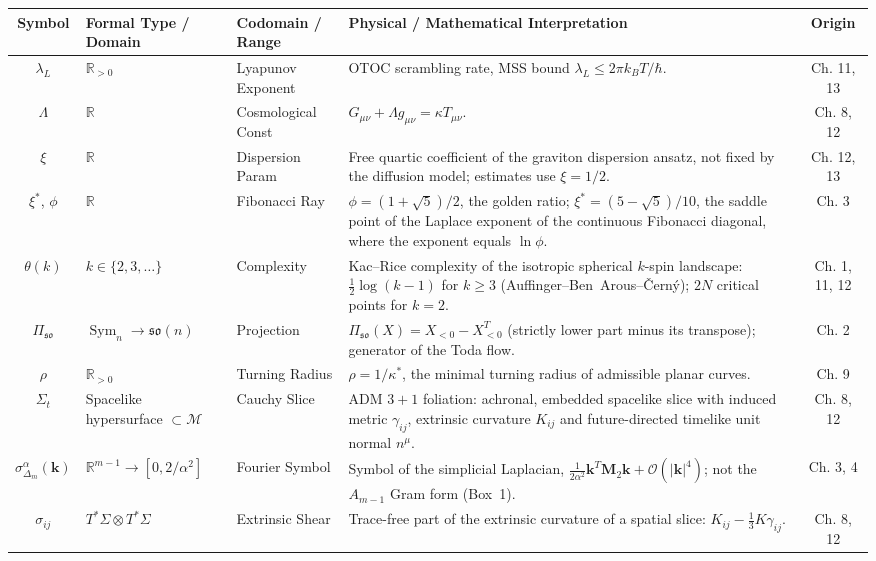 \documentclass[11pt,a4paper,oneside]{article}
\begin{document}
\begin{table}[!htbp]
\centering
\scriptsize
\renewcommand{\arraystretch}{1.2}
\begin{tabularx}{\textwidth}{@{} c p{3.0cm} p{2.6cm} X c @{}}
\toprule
\textbf{Symbol} & \textbf{Formal Type / Domain} & \textbf{Codomain / Range} & \textbf{Physical / Mathematical Interpretation} & \textbf{Origin} \\
\midrule
$\lambda_L$ & $\mathbb{R}_{>0}$ & Lyapunov Exponent & OTOC scrambling rate, MSS bound $\lambda_L \le 2\pi k_B T / \hbar$. & Ch. 11, 13 \\
$\Lambda$ & $\mathbb{R}$ & Cosmological Const & $G_{\mu\nu} + \Lambda g_{\mu\nu} = \kappa T_{\mu\nu}$. & Ch. 8, 12 \\
$\xi$ & $\mathbb{R}$ & Dispersion Param & Free quartic coefficient of the graviton dispersion ansatz, not fixed by the diffusion model; estimates use $\xi = 1/2$. & Ch. 12, 13 \\
$\xi^*$, $\phi$ & $\mathbb{R}$ & Fibonacci Ray & $\phi = (1+\sqrt5)/2$, the golden ratio; $\xi^* = (5-\sqrt5)/10$, the saddle point of the Laplace exponent of the continuous Fibonacci diagonal, where the exponent equals $\ln\phi$. & Ch. 3 \\
$\theta(k)$ & $k \in \{2, 3, \dots\}$ & Complexity & Kac--Rice complexity of the isotropic spherical $k$-spin landscape: $\frac12\log(k-1)$ for $k \ge 3$ (Auffinger--Ben~Arous--\v{C}ern\'y); $2N$ critical points for $k = 2$. & Ch. 1, 11, 12 \\
$\Pi_{\mathfrak{so}}$ & $\operatorname{Sym}_n \to \mathfrak{so}(n)$ & Projection & $\Pi_{\mathfrak{so}}(X) = X_{<0} - X_{<0}^T$ (strictly lower part minus its transpose); generator of the Toda flow. & Ch. 2 \\
$\rho$ & $\mathbb{R}_{>0}$ & Turning Radius & $\rho = 1/\kappa^*$, the minimal turning radius of admissible planar curves. & Ch. 9 \\
$\Sigma_t$ & Spacelike hypersurface $\subset \mathcal{M}$ & Cauchy Slice & ADM $3+1$ foliation: achronal, embedded spacelike slice with induced metric $\gamma_{ij}$, extrinsic curvature $K_{ij}$ and future-directed timelike unit normal $n^\mu$. & Ch. 8, 12 \\
$\sigma_{\Delta_m}^\alpha(\mathbf{k})$ & $\mathbb{R}^{m-1} \to [0, 2/\alpha^2]$ & Fourier Symbol & Symbol of the simplicial Laplacian, $\frac{1}{2\alpha^2}\mathbf{k}^T\mathbf{M}_2\mathbf{k} + \mathcal{O}(|\mathbf{k}|^4)$; not the $A_{m-1}$ Gram form (Box~1). & Ch. 3, 4 \\
$\sigma_{ij}$ & $T^*\Sigma \otimes T^*\Sigma$ & Extrinsic Shear & Trace-free part of the extrinsic curvature of a spatial slice: $K_{ij} - \frac{1}{3}K\gamma_{ij}$. & Ch. 8, 12 \\

\end{tabularx}
\end{table}
\end{document}
